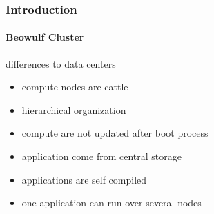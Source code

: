 \documentclass[aspectratio=169]{beamer}
\begin{document}
\begin{frame}[fragile]
\frametitle{Introduction}
\framesubtitle{Beowulf Cluster}
\begin{block}{differences to data centers}
  \begin{itemize}
    \item compute nodes are cattle
    \item hierarchical organization
    \item compute are not updated after boot process
    \item application come from central storage
    \item applications are self compiled
    \item one application can run over several nodes
  \end{itemize}
\end{block}
\end{frame}
%
%
%
%
%
%
%
%
%
%
%
\end{document}
